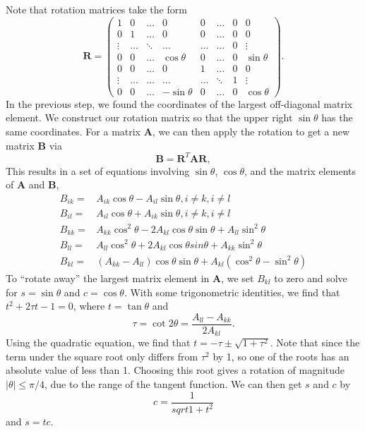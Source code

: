 \documentclass[a4paper,12pt]{report}
\begin{document}
\begin{enumerate}
 Note that rotation matrices take the form
 \[
\mathbf{R}=
 \left( 
   \begin{array}{cccccccc}
   1  &    0  & \dots &   0        &    0  & \dots & 0 &   0       \\
   0  &    1  & \dots &   0        &    0  & \dots & 0 &   0       \\
\vdots & \dots & \ddots & \dots      & \dots & \dots & 0 & \vdots     \\ 
   0  &    0  & \dots & \cos\theta  &    0  & \dots & 0 & \sin\theta \\
   0  &    0  & \dots &   0        &    1  & \dots & 0 &   0       \\
\vdots & \dots & \dots & \dots      & \dots & \ddots & 1 & \vdots     \\
   0  &    0  & \dots &  -\sin\theta        &    0  & \dots & 0 &   \cos\theta   
   \end{array}
 \right).
\]
 In the previous step, we found the coordinates of the largest off-diagonal matrix element. We construct our rotation matrix so that the upper right $\sin\theta$ has the same coordinates. For a matrix $\mathbf{A}$, we can then apply the rotation to get a new matrix $\mathbf{B}$ via
 \[
     \mathbf{B}= \mathbf{R}^T \mathbf{A}\mathbf{R},
  \]
  This results in a set of equations involving $\sin\theta$, $\cos\theta$, and the matrix elements of $\mathbf{A}$ and $\mathbf{B}$, 
  \begin{align*}
  B_{ik} =& A_{ik}\cos\theta - A_{il}\sin\theta , i \ne k, i \ne l \\
  B_{il} =& A_{il}\cos\theta + A_{ik}\sin\theta , i \ne k, i \ne l \\
  B_{kk} =& A_{kk}\cos^2\theta - 2A_{kl}\cos\theta \sin\theta +A_{ll}\sin^2\theta\\
  B_{ll} =& A_{ll}\cos^2\theta +2A_{kl}\cos\theta sin\theta +A_{kk}\sin^2\theta\\
  B_{kl} =& (A_{kk}-A_{ll})\cos\theta \sin\theta +A_{kl}(\cos^2\theta-\sin^2\theta)
\end{align*}
  To ``rotate away'' the largest matrix element in $\mathbf{A}$, we set $B_{kl}$ to zero and solve for $s = \sin\theta$ and $c = \cos\theta$. With some trigonometric identities, we find that $t^2 +2\tau t -1 = 0$, where $t = \tan\theta$ and 
  \[
   \tau = \cot 2\theta = \frac{A_{ll}-A_{kk}}{2A_{kl}}.
  \]
Using the quadratic equation, we find that $t = -\tau \pm \sqrt{1+\tau^2}$. Note that since the term under the square root only differs from $\tau^2$ by 1, so one of the roots has an absolute value of less than 1. Choosing this root gives a rotation of magnitude $|\theta|\leq \pi/4$, due to the range of the tangent function. We can then get $s$ and $c$ by 
\[
 c = \frac{1}{sqrt{1+t^2}}
\]
and $s = tc$. 


\end{enumerate}
\end{document}
